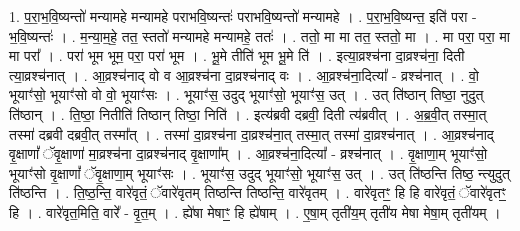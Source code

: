 \documentclass[17pt]{extarticle}
\begin{document}
1. प॒रा॒भ॒वि॒ष्यन्तो॑ मन्यामहे मन्यामहे पराभवि॒ष्यन्तः॑ पराभवि॒ष्यन्तो॑ मन्यामहे । . प॒रा॒भ॒वि॒ष्यन्त॒ इति॑ परा - भ॒वि॒ष्यन्तः॑ । . म॒न्या॒म॒हे॒ तत॒ स्ततो॑ मन्यामहे मन्यामहे॒ ततः॑ । . ततो॒ मा मा तत॒ स्ततो॒ मा । . मा परा॒ परा॒ मा मा परा᳚ । . परा॑ भूम भूम॒ परा॒ परा॑ भूम । . भू॒मे तीति॑ भूम भू॒मे ति॑ । . इत्या॒व्रश्च॑ना दा॒व्रश्च॑ना॒ दिती त्या॒व्रश्च॑नात् । . आ॒व्रश्च॑नाद् वो व आ॒व्रश्च॑ना दा॒व्रश्च॑नाद् वः । . आ॒व्रश्च॑ना॒दित्या᳚ - व्रश्च॑नात् । . वो॒ भूयाꣳ॑सो॒ भूयाꣳ॑सो वो वो॒ भूयाꣳ॑सः । . भूयाꣳ॑स॒ उदुद् भूयाꣳ॑सो॒ भूयाꣳ॑स॒ उत् । . उत् ति॑ष्ठान् तिष्ठा॒ नुदुत् ति॑ष्ठान् । . ति॒ष्ठा॒ नितीति॑ तिष्ठान् तिष्ठा॒ निति॑ । . इत्य॑ब्रवी दब्रवी॒ दिती त्य॑ब्रवीत् । . अ॒ब्र॒वी॒त् तस्मा॒त् तस्मा॑ दब्रवी दब्रवी॒त् तस्मा᳚त् । . तस्मा॑ दा॒व्रश्च॑ना दा॒व्रश्च॑ना॒त् तस्मा॒त् तस्मा॑ दा॒व्रश्च॑नात् । . आ॒व्रश्च॑नाद् वृ॒क्षाणां᳚ ॅवृ॒क्षाणा॑ मा॒व्रश्च॑ना दा॒व्रश्च॑नाद् वृ॒क्षाणा᳚म् । . आ॒व्रश्च॑ना॒दित्या᳚ - व्रश्च॑नात् । . वृ॒क्षाणा॒म् भूयाꣳ॑सो॒ भूयाꣳ॑सो वृ॒क्षाणां᳚ ॅवृ॒क्षाणा॒म् भूयाꣳ॑सः । . भूयाꣳ॑स॒ उदुद् भूयाꣳ॑सो॒ भूयाꣳ॑स॒ उत् । . उत् ति॑ष्ठन्ति तिष्ठ॒ न्त्युदुत् ति॑ष्ठन्ति । . ति॒ष्ठ॒न्ति॒ वारे॑वृतं॒ ॅवारे॑वृतम् तिष्ठन्ति तिष्ठन्ति॒ वारे॑वृतम् । . वारे॑वृतꣳ॒॒ हि हि वारे॑वृतं॒ ॅवारे॑वृतꣳ॒॒ हि । . वारे॑वृत॒मिति॒ वारे᳚ - वृ॒त॒म् । . ह्ये॑षा मेषाꣳ॒॒ हि ह्ये॑षाम् । . ए॒षा॒म् तृती॑य॒म् तृती॑य मेषा मेषा॒म् तृती॑यम् । \newline
\end{document}
